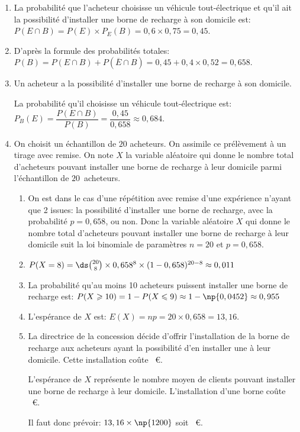 \begin{enumerate}
\item La probabilité que l'acheteur choisisse un véhicule tout-électrique et qu'il ait la possibilité d'installer une borne de recharge à son domicile est:\\
$P(E\cap B) = P(E)\times P_E(B)=0,6\times 0,75 = 0,45$.



\item 
D'après la formule des probabilités totales:\\
$P(B)= P(E\cap B) + P \left (\overline{E}\cap B \right ) = 0,45+0,4\times 0,52=0,658$.

\item Un acheteur a la possibilité d'installer une borne de recharge à son domicile.

La probabilité qu'il choisisse un véhicule tout-électrique est:\\
$P_B(E)=\dfrac{P(E\cap B)}{P(B)} = \dfrac{0,45}{0,658}\approx 0,684$.

\item On choisit un échantillon de $20$ acheteurs. On assimile ce prélèvement à un tirage avec remise.
On note $X$ la variable aléatoire qui donne le nombre total d'acheteurs pouvant installer une borne de recharge à leur domicile parmi l'échantillon de $20$~acheteurs.

	\begin{enumerate}
	\item 
On est dans le cas d'une répétition avec remise d'une expérience n'ayant que 2 issues: la possibilité d'installer une borne de recharge, avec la probabilité $p=0,658$, ou non.
Donc la variable aléatoire $X$ qui donne le nombre total d'acheteurs pouvant installer une borne de recharge à leur domicile suit la loi binomiale de paramètres $n=20$ et $p=0,658$.

		\item $P(X = 8) = \ds\binom{20}{8}\times 0,658^8\times (1-0,658)^{20-8} \approx 0,011$

		\item La probabilité qu'au moins 10 acheteurs puissent installer une borne de recharge est:
$P(X\geqslant 10) = 1-P(X\leqslant 9) \approx 1- \np{0,0452} \approx 0,955$

		\item L'espérance de $X$ est: $E(X)=np=20\times 0,658 = 13,16$.

		\item La directrice de la concession décide d'offrir l'installation de la borne de recharge aux acheteurs ayant la possibilité d'en installer une à leur domicile. Cette installation coûte ~\euro.
		


L'espérance de $X$ représente le nombre moyen de clients pouvant installer une borne de recharge à leur domicile. L'installation d'une borne coûte ~\euro.

Il faut donc prévoir: $13,16\times \np{1200}$ soit ~\euro.
	\end{enumerate}
\end{enumerate}

\bigskip
